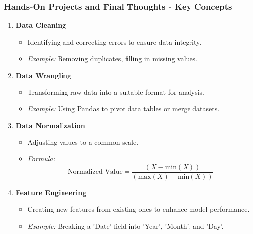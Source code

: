 \documentclass[aspectratio=169]{beamer}
\begin{document}
\begin{frame}[fragile]
    \frametitle{Hands-On Projects and Final Thoughts - Key Concepts}
    \begin{enumerate}
        \item \textbf{Data Cleaning}
            \begin{itemize}
                \item Identifying and correcting errors to ensure data integrity.
                \item \textit{Example:} Removing duplicates, filling in missing values.
            \end{itemize}
        
        \item \textbf{Data Wrangling}
            \begin{itemize}
                \item Transforming raw data into a suitable format for analysis.
                \item \textit{Example:} Using Pandas to pivot data tables or merge datasets.
            \end{itemize}
        
        \item \textbf{Data Normalization}
            \begin{itemize}
                \item Adjusting values to a common scale.
                \item \textit{Formula:} 
                \begin{equation}
                    \text{Normalized Value} = \frac{(X - \text{min}(X))}{(\text{max}(X) - \text{min}(X))}
                \end{equation}
            \end{itemize}
        
        \item \textbf{Feature Engineering}
            \begin{itemize}
                \item Creating new features from existing ones to enhance model performance.
                \item \textit{Example:} Breaking a 'Date' field into 'Year', 'Month', and 'Day'.
            \end{itemize}
    \end{enumerate}
\end{frame}
\end{document}
